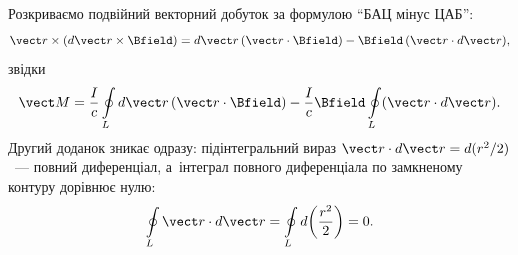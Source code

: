 Розкриваємо подвійний векторний добуток за формулою \enquote{БАЦ мінус ЦАБ}:
\begin{equation*}
	\vect r\times(d\vect r\times\Bfield) = d\vect r\,(\vect r\cdot\Bfield) - \Bfield\,(\vect r\cdot d\vect r),
\end{equation*}
звідки
\begin{equation}\label{eq:TorqueTwoTerms}
	\vect M = \frac{I}{c}\oint\limits_L d\vect r\,(\vect r\cdot\Bfield) - \frac{I}{c}\Bfield\oint\limits_L(\vect r\cdot d\vect r).
\end{equation}
Другий доданок зникає одразу: підінтегральний вираз $\vect r\cdot d\vect r = d(r^2/2)$~---
повний диференціал, а~інтеграл повного диференціала по замкненому контуру дорівнює нулю:
\begin{equation}\label{eq:TotalDiffZero1}
	\oint\limits_L \vect r\cdot d\vect r = \oint\limits_L d\!\left(\frac{r^2}{2}\right) = 0.
\end{equation}

